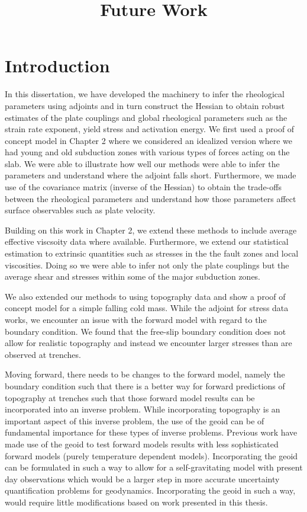 \documentclass[a4paper]{article}
\title{Future Work}
\author{}
\begin{document}
\maketitle



\section{Introduction}

In this dissertation, we have developed the machinery to infer the rheological parameters using adjoints and in turn construct the Hessian to obtain robust estimates of the plate couplings and global rheological parameters such as the strain rate exponent, yield stress and activation energy. We first used a proof of concept model in Chapter 2 where we considered an idealized version where we had young and old subduction zones with various types of forces acting on the slab. We were able to illustrate how well our methods were able to infer the parameters and understand where the adjoint falls short. Furthermore, we made use of the covariance matrix (inverse of the Hessian) to obtain the trade-offs between the rheological parameters and understand how those parameters affect surface observables such as plate velocity.

Building on this work in Chapter 2, we extend these methods to include average effective viscsoity data where available. Furthermore, we extend our statistical estimation to extrinsic quantities such as stresses in the the fault zones and local viscosities. Doing so we were able to infer not only the plate couplings but the average shear and stresses within some of the major subduction zones.

We also extended our methods to using topography data and show a proof of concept model for a simple falling cold mass. While the adjoint for stress data works, we encounter an issue with the forward model with regard to the boundary condition. We found that the free-slip boundary condition does not allow for realistic topography and instead we encounter larger stresses than are observed at trenches. 

Moving forward, there needs to be changes to the forward model, namely the boundary condition such that there is a better way for forward predictions of topography at trenches such that those forward model results can be incorporated into an inverse problem. While incorporating topography is an important aspect of this inverse problem, the use of the geoid can be of fundamental importance for these types of inverse problems. Previous work have made use of the geoid to test forward models results with less sophisticated forward models (purely temperature dependent models). Incorporating the geoid can be formulated in such a way to allow for a self-gravitating model with present day observations which would be a larger step in more accurate uncertainty quantification problems for geodynamics. Incorporating the geoid in such a way, would require little modifications based on work presented in this thesis.
\end{document}
